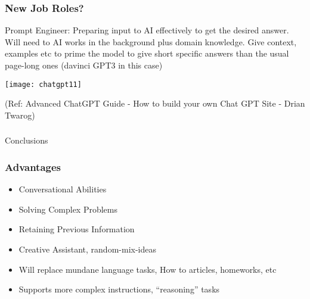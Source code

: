 \begin{frame}[fragile]\frametitle{New Job Roles?}
Prompt Engineer: Preparing input to AI effectively to get the desired answer. Will need to AI works in the background plus domain knowledge. Give context, examples etc to prime the model to give short specific answers than the usual page-long ones (davinci GPT3 in this case)

			\begin{center}
			\texttt{[image: chatgpt11]}
			
			\end{center}		
			
			{\tiny (Ref: Advanced ChatGPT Guide - How to build your own Chat GPT Site - Drian Twarog)}
			

\end{frame}

\begin{frame}[fragile]\frametitle{}
\begin{center}
{\Large Conclusions}
\end{center}
\end{frame}




\begin{frame}[fragile]\frametitle{Advantages}


\begin{itemize}
\item Conversational Abilities
\item Solving Complex Problems
\item Retaining Previous Information
\item Creative Assistant, random-mix-ideas
\item Will replace mundane language tasks, How to articles, homeworks, etc
\item Supports more complex instructions, ``reasoning'' tasks
\end{itemize}	 

\end{frame}

